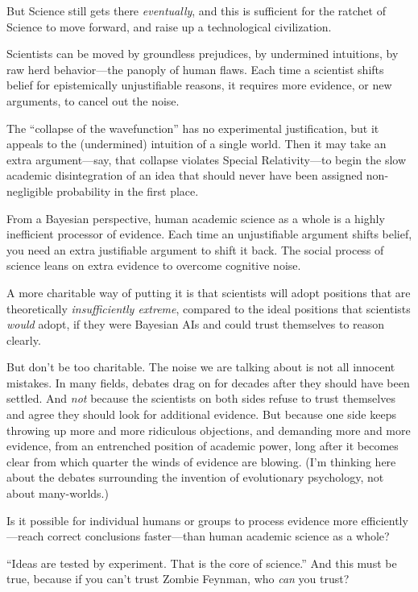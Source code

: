 {
 But Science still gets there \textit{eventually}, and this is
sufficient for the ratchet of Science to move forward, and raise up a
technological civilization.}

{
 Scientists can be moved by groundless prejudices, by undermined
intuitions, by raw herd behavior---the panoply of human flaws. Each
time a scientist shifts belief for epistemically unjustifiable reasons,
it requires more evidence, or new arguments, to cancel out the noise.}

{
 The ``collapse of the
wavefunction'' has no experimental justification, but
it appeals to the (undermined) intuition of a single world. Then it may
take an extra argument---say, that collapse violates Special
Relativity---to begin the slow academic disintegration of an idea that
should never have been assigned non-negligible probability in the first
place.}

{
 From a Bayesian perspective, human academic science as a whole is
a highly inefficient processor of evidence. Each time an unjustifiable
argument shifts belief, you need an extra justifiable argument to shift
it back. The social process of science leans on extra evidence to
overcome cognitive noise.}

{
 A more charitable way of putting it is that scientists will adopt
positions that are theoretically \textit{insufficiently extreme},
compared to the ideal positions that scientists \textit{would} adopt,
if they were Bayesian AIs and could trust themselves to reason
clearly.}

{
 But don't be too charitable. The noise we are
talking about is not all innocent mistakes. In many fields, debates
drag on for decades after they should have been settled. And
\textit{not} because the scientists on both sides refuse to trust
themselves and agree they should look for additional evidence. But
because one side keeps throwing up more and more ridiculous objections,
and demanding more and more evidence, from an entrenched position of
academic power, long after it becomes clear from which quarter the
winds of evidence are blowing. (I'm thinking here about
the debates surrounding the invention of evolutionary psychology, not
about many-worlds.)}

{
 Is it possible for individual humans or groups to process evidence
more efficiently---reach correct conclusions faster---than human
academic science as a whole?}

{
 ``Ideas are tested by experiment. That is the
core of science.'' And this must be true, because if
you can't trust Zombie Feynman, who \textit{can} you
trust?}

